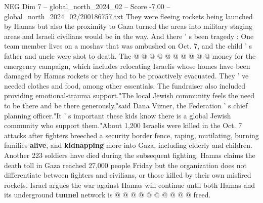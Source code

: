 \begin{textsample}{NEG Dim 7 – global\_north\_2024\_02 – Score -7.00 – global\_north\_2024\_02/200186757.txt}
They were fleeing rockets being launched by Hamas but also the proximity to Gaza turned the areas into military staging areas and Israeli civilians would be in the way.
And there ' s been tragedy : One team member lives on a moshav that was ambushed on Oct. 7, and the child ' s father and uncle were shot to death.
The @ @ @ @ @ @ @ @ @ @ money for the emergency campaign, which includes relocating Israelis whose homes have been damaged by Hamas rockets or they had to be proactively evacuated.
They ' ve needed clothes and food, among other essentials.
The fundraiser also included providing emotional-trauma support."The local Jewish community feels the need to be there and be there generously,"said Dana Vizner, the Federation ' s chief planning officer."It ' s important these kids know there is a global Jewish community who support them."About 1,200 Israelis were killed in the Oct. 7 attacks after fighters breeched a security border fence, raping, mutilating, burning families \textbf{alive}, and \textbf{kidnapping} more into Gaza, including elderly and children.
Another 223 soldiers have died during the subsequent fighting.
Hamas claims the death toll in Gaza reached 27,000 people Friday but the organization does not differentiate between fighters and civilians, or those killed by their own misfired rockets.
Israel argues the war against Hamas will continue until both Hamas and its underground \textbf{tunnel} network is @ @ @ @ @ @ @ @ @ @ freed.

\end{textsample}
